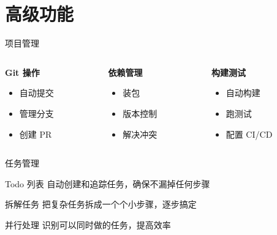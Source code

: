 \documentclass[aspectratio=169,xcolor=dvipsnames]{beamer}
\begin{document}
\section{高级功能}

\begin{frame}{项目管理}
  \begin{columns}
    \begin{column}{0.3\textwidth}
      \textbf{Git 操作}
      \begin{itemize}
        \item 自动提交
        \item 管理分支
        \item 创建 PR
      \end{itemize}
    \end{column}
    \begin{column}{0.3\textwidth}
      \textbf{依赖管理}
      \begin{itemize}
        \item 装包
        \item 版本控制
        \item 解决冲突
      \end{itemize}
    \end{column}
    \begin{column}{0.3\textwidth}
      \textbf{构建测试}
      \begin{itemize}
        \item 自动构建
        \item 跑测试
        \item 配置 CI/CD
      \end{itemize}
    \end{column}
  \end{columns}
\end{frame}

\begin{frame}{任务管理}
  \begin{block}{Todo 列表}
    自动创建和追踪任务，确保不漏掉任何步骤
  \end{block}

  \vspace{0.3cm}

  \begin{exampleblock}{拆解任务}
    把复杂任务拆成一个个小步骤，逐步搞定
  \end{exampleblock}

  \vspace{0.3cm}

  \begin{alertblock}{并行处理}
    识别可以同时做的任务，提高效率
  \end{alertblock}
\end{frame}
\end{document}
